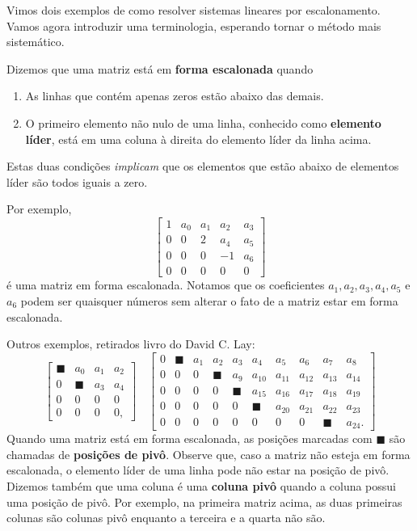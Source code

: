 Vimos dois exemplos de como resolver sistemas lineares por escalonamento. Vamos agora introduzir uma terminologia, esperando tornar o método mais sistemático.

Dizemos que uma matriz está em \textbf{forma escalonada} quando
\begin{enumerate}
  \item As linhas que contém apenas zeros estão abaixo das demais.
  \item O primeiro elemento não nulo de uma linha, conhecido como \textbf{elemento líder}, está em uma coluna à direita do elemento líder da linha acima.
\end{enumerate} Estas duas condições \emph{implicam} que os elementos que estão abaixo de elementos líder são todos iguais a zero.

Por exemplo,
\begin{equation}\label{escalonada1}
\left[
\begin{array}{ccccc}
1 & a_0 & a_1 & a_2 & a_3 \\
0 & 0 & 2 & a_4 & a_5 \\
0 & 0 & 0 & -1 & a_6 \\
0 & 0 & 0 & 0 & 0
\end{array}
\right]
\end{equation} é uma matriz em forma escalonada. Notamos que os coeficientes $a_1, a_2, a_3, a_4, a_5$ e $a_6$ podem ser quaisquer números sem alterar o fato de a matriz estar em forma escalonada.

Outros exemplos, retirados livro do David C. Lay:
\begin{equation}
\left[
\begin{array}{cccc}
\blacksquare & a_0 & a_1 & a_2 \\
0 & \blacksquare & a_3 & a_4 \\
0 & 0 & 0 & 0 \\
0 & 0 & 0 & 0,
\end{array}
\right] \quad
\left[
\begin{array}{cccccccccc}
0 & \blacksquare & a_1 & a_2 & a_3 & a_4 & a_5 & a_6 & a_7 & a_8\\
0 & 0 & 0 & \blacksquare & a_9 & a_{10} & a_{11} & a_{12} & a_{13} & a_{14}\\
0 & 0 & 0 & 0 & \blacksquare & a_{15} & a_{16} & a_{17} & a_{18} & a_{19}\\
0 & 0 & 0 & 0 & 0 & \blacksquare & a_{20} & a_{21} & a_{22} & a_{23} \\
0 & 0 & 0 & 0 & 0 & 0 & 0 & 0 & \blacksquare & a_{24}.
\end{array}
\right]
\end{equation} Quando uma matriz está em forma escalonada, as posições marcadas com $\blacksquare$ são chamadas de \textbf{posições de pivô}. Observe que, caso a matriz não esteja em forma escalonada, o elemento líder de uma linha pode não estar na posição de pivô. Dizemos também que uma coluna é uma \textbf{coluna pivô} quando a coluna possui uma posição de pivô. Por exemplo, na primeira matriz acima, as duas primeiras colunas são colunas pivô enquanto a terceira e a quarta não são.

